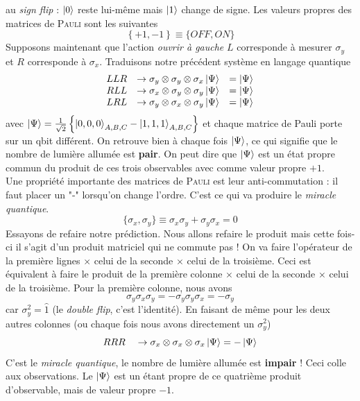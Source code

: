 au \textit{sign flip} : $\ket 0$ reste lui-même mais $\ket1$ change de signe. Les valeurs propres
des matrices de \textsc{Pauli} sont les suivantes
\begin{equation}
\left\{+1,-1\right\} \equiv \{OFF,ON\}
\end{equation}
Supposons maintenant que l'action \textit{ouvrir à gauche} $L$ corresponde à mesurer $\sigma_y$ et 
$R$ corresponde à $\sigma_x$. Traduisons notre précédent système en langage quantique
\begin{equation}
\begin{array}{lll}
LLR&\to \sigma_y\otimes\sigma_y\otimes \sigma_x\ket\Psi &=\ket\Psi\\
RLL&\to \sigma_x\otimes\sigma_y\otimes \sigma_y\ket\Psi &=\ket\Psi\\
LRL&\to \sigma_y\otimes\sigma_x\otimes \sigma_y\ket\Psi &=\ket\Psi
\end{array}
\end{equation}
avec $\ket\Psi = \frac{1}{\sqrt{2}}\left\{\ket{0,0,0}_{A,B,C}-\ket{1,1,1}_{A,B,C}\right\}$ et chaque
matrice de Pauli porte sur un qbit différent. On retrouve bien à chaque fois $\ket\Psi$, ce qui
signifie que le nombre de lumière allumée est \textbf{pair}. On peut dire que $\ket\Psi$ est un
état propre commun du produit de ces trois observables avec comme valeur propre $+1$.\\

Une propriété importante des matrices de \textsc{Pauli} est leur anti-commutation : il faut placer
un "-" lorsqu'on change l'ordre. C'est ce qui va produire le \textit{miracle quantique}.
\begin{equation}
\{\sigma_x,\sigma_y\} \equiv \sigma_x\sigma_y+\sigma_y\sigma_x=0
\end{equation}
Essayons de refaire notre prédiction. Nous allons refaire le produit mais cette fois-ci il 
s'agit d'un produit matriciel qui ne commute pas ! On va faire l'opérateur de la première lignes
$\times$ celui de la seconde $\times$ celui de la troisième. Ceci est équivalent à faire
le produit de la première colonne $\times$ celui de la seconde $\times$ celui de la troisième. Pour
la première colonne, nous avons
\begin{equation}
\sigma_y\sigma_x\sigma_y = -\sigma_y\sigma_y\sigma_x = -\sigma_y
\end{equation}
car $\sigma_y^2=\hat{1}$ (le \textit{double flip}, c'est l'identité). En faisant de même pour
les deux autres colonnes (ou chaque fois nous avons directement un $\sigma_y^2$)
\begin{equation}
RRR\quad\to \sigma_x\otimes\sigma_x\otimes\sigma_x\ket\Psi = -\ket\Psi
\end{equation}
C'est le \textit{miracle quantique}, le nombre de lumière allumée est \textbf{impair} ! Ceci 
colle aux observations. Le $\ket\Psi$ est un étant propre de ce quatrième produit d'observable, mais
de valeur propre $-1$.


